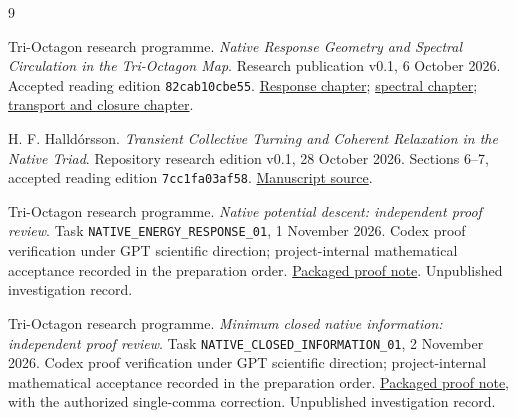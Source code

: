 \begin{thebibliography}{9}\small\raggedright
{}
Tri-Octagon research programme.
\emph{Native Response Geometry and Spectral Circulation in the Tri-Octagon Map}.
Research publication v0.1, 6 October 2026.
Accepted reading edition \texttt{82cab10cbe55}.
\href{https://github.com/pzychozen/trioctagon-physics/blob/82cab10cbe550f58c43163fb8b05fabdad1b05ae/papers/NATIVE_RESPONSE_GEOMETRY/manuscript/response.tex}{Response chapter};
\href{https://github.com/pzychozen/trioctagon-physics/blob/82cab10cbe550f58c43163fb8b05fabdad1b05ae/papers/NATIVE_RESPONSE_GEOMETRY/manuscript/spectral.tex}{spectral chapter};
\href{https://github.com/pzychozen/trioctagon-physics/blob/82cab10cbe550f58c43163fb8b05fabdad1b05ae/papers/NATIVE_RESPONSE_GEOMETRY/manuscript/observables_closure.tex}{transport and closure chapter}.

H. F. Halld\'orsson.
\emph{Transient Collective Turning and Coherent Relaxation in the Native Triad}.
Repository research edition v0.1, 28 October 2026.
Sections 6--7, accepted reading edition \texttt{7cc1fa03af58}.
\href{https://github.com/pzychozen/trioctagon-physics/blob/7cc1fa03af589818bcdcfaaac51838cc36c84253/papers/COLLECTIVE_TURNING_AND_COHERENT_RELAXATION/v0.1/main.tex}{Manuscript source}.

Tri-Octagon research programme.
\emph{Native potential descent: independent proof review}.
Task \mbox{\texttt{NATIVE\_ENERGY\_RESPONSE\_01}}, 1 November 2026.
Codex proof verification under GPT scientific direction; project-internal mathematical acceptance recorded in the preparation order.
\href{evidence/NATIVE_ENERGY_RESPONSE_01/NATIVE_ENERGY_RESPONSE_01_PROOF_REVIEW.md}{Packaged proof note}.
Unpublished investigation record.

Tri-Octagon research programme.
\emph{Minimum closed native information: independent proof review}.
Task \mbox{\texttt{NATIVE\_CLOSED\_INFORMATION\_01}}, 2 November 2026.
Codex proof verification under GPT scientific direction; project-internal mathematical acceptance recorded in the preparation order.
\href{evidence/NATIVE_CLOSED_INFORMATION_01/NATIVE_CLOSED_INFORMATION_01_PROOF_REVIEW.md}{Packaged proof note}, with the authorized single-comma correction.
Unpublished investigation record.
\end{thebibliography}
